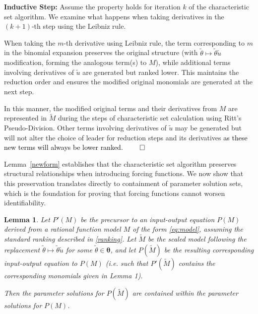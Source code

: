 \documentclass[a4paper,fleqn]{cas-dc}
\newtheorem{lemma}{Lemma}
\theoremstyle{definition}
\begin{document}
\begin{pfs}
    \textbf{Inductive Step:} Assume the property holds for iteration $k$ of the characteristic set algorithm. We examine what happens when taking derivatives in the $(k+1)$-th step using the Leibniz rule.
    
   
    When taking the $m$-th derivative using Leibniz rule, the term corresponding to $m$ in the binomial expansion preserves the original structure (with $\tilde{\theta} \mapsto \tilde{\theta}\tilde{u}$ modification, forming the analogous term(s) to $M$), while additional terms involving derivatives of $\tilde{u}$ are generated but ranked lower. This maintains the reduction order and ensures the modified original monomials are generated at the next step.
    
    In this manner, the modified original terms and their derivatives from $M$ are represented in $\tilde{M}$ during the steps of characteristic set calculation using Ritt's Pseudo-Division.
    Other terms involving derivatives of $\tilde{u}$ may be generated but will not alter the choice of leader for reduction steps and its derivatives \textcolor{black}{as these new terms will always be lower ranked. $\qed$}    
\end{pfs}


\vspace{0.2cm}
\noindent Lemma~\ref{newform} establishes that the characteristic set algorithm preserves structural relationships when introducing forcing functions. We now show that this preservation translates directly to containment of parameter solution sets, which is the foundation for proving that forcing functions cannot worsen identifiability.

\begin{lemma} \label{infsafe}
    Let $P'(M)$ be the precursor to an input-output equation $P(M)$ derived from a rational function model $M$ of the form \cref{eq:model}, assuming the standard ranking described in \cref{ranking}. 
    Let $\tilde{M}$ be the scaled model following the replacement $\tilde{\theta}\mapsto \tilde{\theta}\tilde{u}$ for some $\tilde{\theta} \in \pmb{\theta}$, and let $P(\tilde{M})$ be the resulting corresponding input-output equation to $P(M)$ (i.e. such that $P'(\tilde{M})$ contains the corresponding monomials given in Lemma 1).
    
    Then the parameter solutions for $P(\tilde{M})$ are contained within the parameter solutions for $P(M)$. 
\end{lemma}
\end{document}
